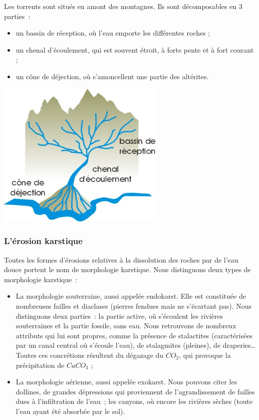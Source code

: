 \documentclass[a4paper,11pt]{article}
\begin{document}
Les torrents sont situés en amont des montagnes.
Ils sont décomposables en 3 parties~:
\begin{itemize}
  \item un bassin de réception, où l'eau emporte les différentes roches ;
  \item un chenal d'écoulement, qui est souvent étroit, à forte pente et à fort courant ;
  \item un cône de déjection, où s'amoncellent une partie des altérites.
\end{itemize}

\begin{center}
  \includegraphics[width=8cm]{Images/Erosion/torrent2.jpg}
\end{center}

\subsubsection{L'érosion karstique}

Toutes les formes d'érosions relatives à la dissolution des roches par de l'eau douce portent le nom de morphologie karstique.
Nous distinguons deux types de morphologie karstique~:
\begin{itemize}
  \item La morphologie souterraine, aussi appelée endokarst.
  Elle est constituée de nombreuses failles et diaclases (pierres fendues mais ne s'écartant pas).
  Nous distinguons deux parties~: la partie active, où s'écoulent les rivières souterraines et la partie fossile, sans eau.
  Nous retrouvons de nombreux attributs qui lui sont propres, comme la présence de stalactites (caractérisées par un canal central où s'écoule l'eau), de stalagmites (pleines), de draperies\ldots
  Toutes ces concrétions résultent du dégazage du $CO_2$, qui provoque la précipitation de $CaCO_3$ ;

  \item La morphologie aérienne, aussi appelée exokarst.
  Nous pouvons citer les dollines, de grandes dépressions qui proviennent de l'agrandissement de failles dues à l'infiltration de l'eau~; les canyons, où encore les rivières sèches (toute l'eau ayant été absorbée par le sol).
\end{itemize}
\end{document}

